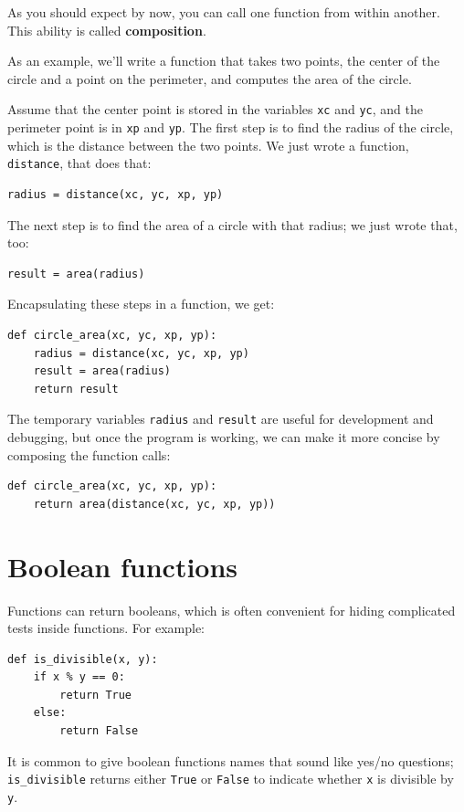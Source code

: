 \documentclass[10pt]{book}
\begin{document}
As you should expect by now, you can call one function from
within another.  This ability is called {\bf composition}.

As an example, we'll write a function that takes two points,
the center of the circle and a point on the perimeter, and computes
the area of the circle.

Assume that the center point is stored in the variables {\tt xc} and
{\tt yc}, and the perimeter point is in {\tt xp} and {\tt yp}. The
first step is to find the radius of the circle, which is the distance
between the two points.  We just wrote a function, {\tt
distance}, that does that:

\begin{verbatim}
radius = distance(xc, yc, xp, yp)
\end{verbatim}
%
The next step is to find the area of a circle with that radius;
we just wrote that, too:

\begin{verbatim}
result = area(radius)
\end{verbatim}
%
Encapsulating these steps in a function, we get:

\begin{verbatim}
def circle_area(xc, yc, xp, yp):
    radius = distance(xc, yc, xp, yp)
    result = area(radius)
    return result
\end{verbatim}
%
The temporary variables {\tt radius} and {\tt result} are useful for
development and debugging, but once the program is working, we can
make it more concise by composing the function calls:

\begin{verbatim}
def circle_area(xc, yc, xp, yp):
    return area(distance(xc, yc, xp, yp))
\end{verbatim}
%

\section{Boolean functions}
\label{boolean}

Functions can return booleans, which is often convenient for hiding
complicated tests inside functions.  
For example:

\begin{verbatim}
def is_divisible(x, y):
    if x % y == 0:
        return True
    else:
        return False
\end{verbatim}
%
It is common to give boolean functions names that sound like yes/no
questions; \verb"is_divisible" returns either {\tt True} or {\tt False}
to indicate whether {\tt x} is divisible by {\tt y}.
\end{document}
